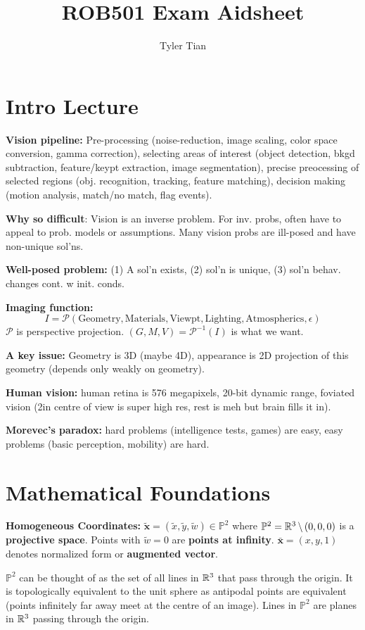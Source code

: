 \documentclass[twocolumn, 10pt]{extarticle}
\title{ROB501 Exam Aidsheet}
\author{Tyler Tian}
\begin{document}
\section{Intro Lecture}

\textbf{Vision pipeline:} Pre-processing (noise-reduction, image scaling, color space conversion, gamma correction),
selecting areas of interest (object detection, bkgd subtraction, feature/keypt extraction, image segmentation), precise
preocessing of selected regions (obj. recognition, tracking, feature matching), decision making (motion analysis,
match/no match, flag events).

\textbf{Why so difficult}: Vision is an inverse problem. For inv. probs, often have to appeal to prob. models or
assumptions. Many vision probs are ill-posed and have non-unique sol'ns.

\textbf{Well-posed problem:} (1) A sol'n exists, (2) sol'n is unique, (3) sol'n behav. changes cont. w init. conds.

\textbf{Imaging function:} \[I =
\mathcal{P}(\text{Geometry},\text{Materials},\text{Viewpt},\text{Lighting},\text{Atmospherics}, \epsilon)\]
$\mathcal{P}$ is perspective projection. $(G, M, V) = \mathcal{P}^{-1}(I)$ is what we want.

\textbf{A key issue:}
Geometry is 3D (maybe 4D), appearance is 2D projection of this geometry (depends only weakly on geometry).

\textbf{Human vision:} human retina is 576 megapixels, 20-bit dynamic range, foviated vision (2\degree in centre of view
is super high res, rest is meh but brain fills it in).

\textbf{Morevec's paradox:} hard problems (intelligence tests, games) are easy, easy problems (basic perception,
mobility) are hard.

\section{Mathematical Foundations} %

\textbf{Homogeneous Coordinates:} \(\tilde{\bm x} = (\tilde x, \tilde y, \tilde w)\in \mathbb P^2\) where
\(\mathbb P^2 = \mathbb{R}^3\,\backslash\,(0, 0, 0)\) is a \textbf{projective space}. Points with \(\tilde w = 0\) are
\textbf{points at infinity}. \(\bar{\bm x} = (x, y, 1)\) denotes normalized form or \textbf{augmented vector}.

\(\mathbb P^2\) can be thought of as the set of all lines in \(\mathbb{R}^3\) that pass through the origin. It is
topologically equivalent to the unit sphere as antipodal points are equivalent (points infinitely far away meet at the
centre of an image). Lines in \(\mathbb P^2\) are planes in \(\mathbb{R}^3\) passing through the origin.
\end{document}
